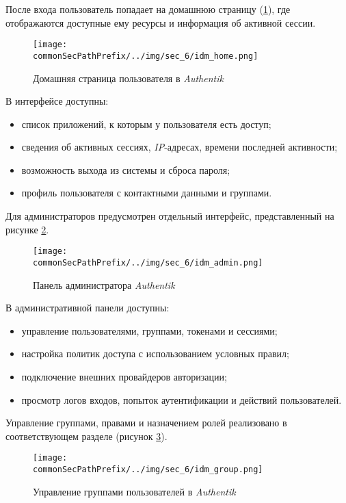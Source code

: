 После входа пользователь попадает на домашнюю страницу (\ref{fig:user_guide:idm_home}), где отображаются доступные ему ресурсы и информация об активной сессии.

\begin{figure}[ht]
    \centering
    \texttt{[image: \\commonSecPathPrefix/../img/sec\_6/idm\_home.png]}
    \caption{Домашняя страница пользователя в \textit{Authentik}}
    \label{fig:user_guide:idm_home}
\end{figure}

В интерфейсе доступны:
\begin{itemize}
    \item список приложений, к которым у пользователя есть доступ;
    \item сведения об активных сессиях, \textit{IP}-адресах, времени последней активности;
    \item возможность выхода из системы и сброса пароля;
    \item профиль пользователя с контактными данными и группами.
\end{itemize}

Для администраторов предусмотрен отдельный интерфейс, представленный на рисунке \ref{fig:user_guide:idm_admin}.

\begin{figure}[ht]
    \centering
    \texttt{[image: \\commonSecPathPrefix/../img/sec\_6/idm\_admin.png]}
    \caption{Панель администратора \textit{Authentik}}
    \label{fig:user_guide:idm_admin}
\end{figure}

В административной панели доступны:
\begin{itemize}
    \item управление пользователями, группами, токенами и сессиями;
    \item настройка политик доступа с использованием условных правил;
    \item подключение внешних провайдеров авторизации;
    \item просмотр логов входов, попыток аутентификации и действий пользователей.
\end{itemize}

Управление группами, правами и назначением ролей реализовано в соответствующем разделе (рисунок \ref{fig:user_guide:idm_group}).

\begin{figure}[ht]
    \centering
    \texttt{[image: \\commonSecPathPrefix/../img/sec\_6/idm\_group.png]}
    \caption{Управление группами пользователей в \textit{Authentik}}
    \label{fig:user_guide:idm_group}
\end{figure}

